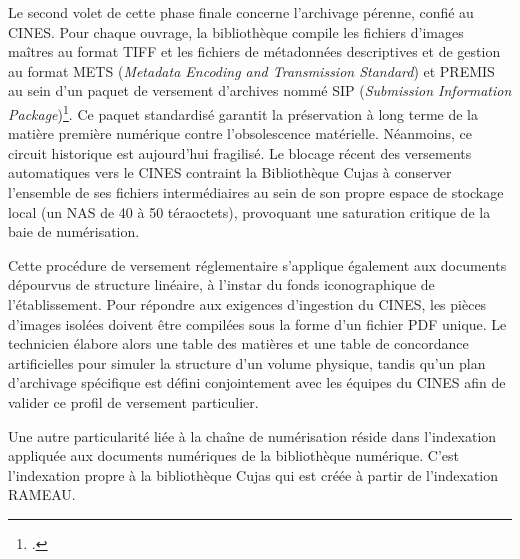 Le second volet de cette phase finale concerne l'archivage pérenne, confié au \ac{CINES}. Pour chaque ouvrage, la bibliothèque compile les fichiers d'images maîtres au format \ac{TIFF} et les fichiers de métadonnées descriptives et de gestion au format \ac{METS} (\textit{Metadata Encoding and Transmission Standard}) et PREMIS au sein d'un paquet de versement d'archives nommé \ac{SIP} (\textit{Submission Information Package})\footcite{2010CRArchivage}. Ce paquet standardisé garantit la préservation à long terme de la matière première numérique contre l'obsolescence matérielle. Néanmoins, ce circuit historique est aujourd'hui fragilisé. Le blocage récent des versements automatiques vers le \ac{CINES} contraint la Bibliothèque Cujas à conserver l'ensemble de ses fichiers intermédiaires au sein de son propre espace de stockage local (un \ac{NAS} de 40 à 50 téraoctets), provoquant une saturation critique de la baie de numérisation.

Cette procédure de versement réglementaire s'applique également aux documents dépourvus de structure linéaire, à l'instar du fonds iconographique de l'établissement. Pour répondre aux exigences d'ingestion du \ac{CINES}, les pièces d'images isolées doivent être compilées sous la forme d'un fichier \ac{PDF} unique. Le technicien élabore alors une table des matières et une table de concordance artificielles pour simuler la structure d'un volume physique, tandis qu'un plan d'archivage spécifique est défini conjointement avec les équipes du \ac{CINES} afin de valider ce profil de versement particulier.

Une autre particularité liée à la chaîne de numérisation réside dans l'indexation appliquée aux documents numériques de la bibliothèque numérique. C'est l'indexation propre à la bibliothèque Cujas qui est créée à partir de l'indexation \ac{RAMEAU}. 
